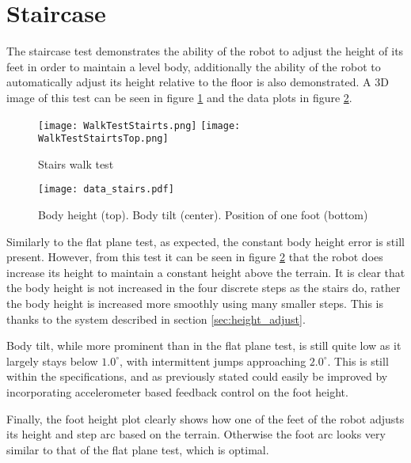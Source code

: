     \newpage
    \section{Staircase}
    The staircase test demonstrates the ability of the robot to adjust the height of its feet in order to maintain a level body,
    additionally the ability of the robot to automatically adjust its height relative to the floor is also demonstrated. A 3D image
    of this test can be seen in figure \ref{fig:stairs_test} and the data plots in figure \ref{fig:stairs_test_data}.
    \begin{figure}[h]
        \centering
        \texttt{[image: WalkTestStairts.png]}
        \texttt{[image: WalkTestStairtsTop.png]}
        \caption{Stairs walk test}
        \label{fig:stairs_test}
    \end{figure}
    \begin{figure}[h]
        \centering
        \texttt{[image: data\_stairs.pdf]}
        \caption{Body height (top). Body tilt (center). Position of one foot (bottom)}
        \label{fig:stairs_test_data}
    \end{figure}

    \noindent
    Similarly to the flat plane test, as expected, the constant body height error is still present.
    However, from this test it can be seen in figure \ref{fig:stairs_test_data} that the robot does increase its height to maintain a constant
    height above the terrain. It is clear that the body height is not increased in the four discrete steps as the stairs do, rather the
    body height is increased more smoothly using many smaller steps. This is thanks to the system described in section \ref{sec:height_adjust}.

    Body tilt, while more prominent than in the flat plane test, is still quite low as it largely stays below \(1.0^\circ\), with intermittent jumps approaching \(2.0^\circ\).
    This is still within the specifications, and as previously stated could easily be improved by incorporating accelerometer based feedback control on the foot height.

    \noindent
    Finally, the foot height plot clearly shows how one of the feet of the robot adjusts its height and step arc based on the terrain. Otherwise the foot arc looks very similar to that of the
    flat plane test, which is optimal.
    
    \newpage
